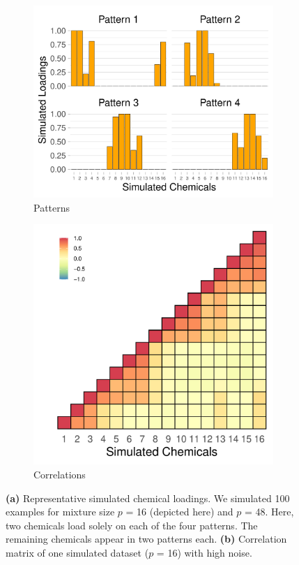 \begin{landscape}
\begin{figure}
\flushright
\begin{subfigure}[c]{0.7\textwidth}
\includegraphics[width=1\linewidth]{./figures/loadings_plot.pdf}
\caption{Patterns}
\label{fig:simpatterns}
\end{subfigure}
\hspace{-0.45em}
\begin{subfigure}[c]{0.6\textwidth}
\includegraphics[width=.95\linewidth]{./figures/sim_corr.pdf}
\caption{Correlations}
\label{fig:simcorr}
\end{subfigure}
\hfill
\caption[Simulated chemical loadings and correlation]{\textbf{(a)} Representative simulated chemical loadings. We simulated 100 examples for mixture size $p$ = 16 (depicted here) and $p$ = 48. Here, two chemicals load solely on each of the four patterns. The remaining chemicals appear in two patterns each. \textbf{(b)} Correlation matrix of one simulated dataset ($p$ = 16) with high noise.}
\end{figure}
\end{landscape}

